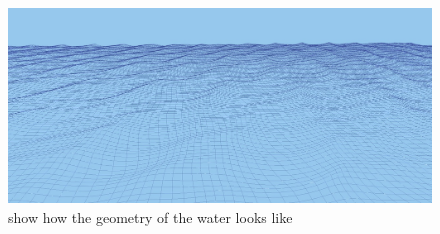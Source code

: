 \documentclass[12pt,letterpaper]{article}
\begin{document}
\begin{figure}[p]
    \centering
    \includegraphics[width=1.0\textwidth]{geometry.jpg}
    \caption{show how the geometry of the water looks like}
\end{figure}
\end{document}
